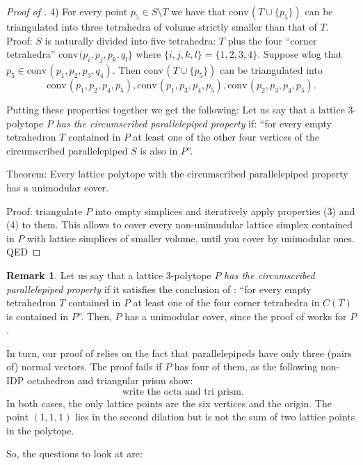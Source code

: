 \documentclass{amsart}
\theoremstyle{plain}
\theoremstyle{definition}
\newtheorem{remark}[theorem]{Remark}
\newcommand{\conv}{\ensuremath{\mathrm{conv}}\hspace{1pt}}
\newcommand{\paco}[1]{\todo[size=\tiny,color=green!30]{#1 \\ \hfill --- P.}}
\begin{document}
\begin{proof}[Proof of ]
\paco{rewrite}
4) For every point $p_5 \in S \setminus T$ we have that $\conv(T\cup \{p_5\})$ can be triangulated into three tetrahedra of volume strictly smaller than that of $T$. Proof: $S$ is naturally divided into five tetrahedra: $T$ plus the four ``corner tetrahedra'' $\conv(p_i,p_j,p_k,q_l\}$ where $\{i,j,k,l\}= \{1,2,3,4\}$. Suppose wlog that $p_5 \in \conv(p_1,p_2,p_3, q_4)$. Then $\conv(T\cup \{p_5\})$ can be triangulated into 
\[
\conv(p_1,p_2,p_4, p_5),
\conv(p_1,p_3,p_4, p_5),
\conv(p_2,p_3,p_4, p_5).
\]

Putting these properties together we get the following: Let us say that a lattice $3$-polytope $P$ \emph{has the circumscribed parallelepiped property} if: ``for every empty tetrahedron $T$ contained in $P$ at least one of the other four vertices of the circumscribed parallelepiped $S$ is also in $P$''.

Theorem: Every lattice polytope with the circumscribed parallelepiped property has a unimodular cover.

Proof: triangulate $P$ into empty simplices and iteratively apply properties (3) and (4) to them. This allows to cover every non-unimudular lattice simplex contained in $P$ with lattice simplices of smaller volume, until you cover by unimodular ones. QED
\end{proof}

\begin{remark}
\label{rem:octahedra_and_tri-prisms}
Let us say that a lattice $3$-polytope $P$ \emph{has the circumscribed parallelepiped property} if it satisfies the conclusion of :  ``for every empty tetrahedron $T$ contained in $P$ at least one of the four corner tetrahedra in $C(T)$ is 
contained in $P$''. Then, $P$ has a unimodular cover, since the proof of  works for $P$.

In turn, our proof of  relies on the fact that parallelepipeds have only three (pairs of) normal vectors. The proof fails if $P$ has four of them, as the following non-IDP octahedron and triangular prism show:
\[
\text{ write the octa and tri prism}.
\]
In both cases, the only lattice points are the six vertices and the origin. The point $(1,1,1)$ lies in the second dilation but is not the sum of two lattice points in the polytope.
\end{remark}



So, the questions to look at are:
\end{document}
